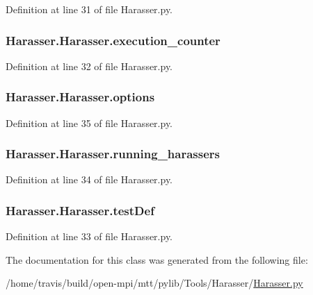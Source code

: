 Definition at line 31 of file Harasser.\-py.

\hypertarget{classHarasser_1_1Harasser_a96c7c91ef5d33784056c567ba49a2c8a}{
\subsubsection[{execution\-\_\-counter}]{\setlength{\rightskip}{0pt plus 5cm}Harasser.\-Harasser.\-execution\-\_\-counter}}\label{classHarasser_1_1Harasser_a96c7c91ef5d33784056c567ba49a2c8a}


Definition at line 32 of file Harasser.\-py.

\hypertarget{classHarasser_1_1Harasser_ab9ed73d71cdaae7d9b5cc81548823527}{
\subsubsection[{options}]{\setlength{\rightskip}{0pt plus 5cm}Harasser.\-Harasser.\-options}}\label{classHarasser_1_1Harasser_ab9ed73d71cdaae7d9b5cc81548823527}


Definition at line 35 of file Harasser.\-py.

\hypertarget{classHarasser_1_1Harasser_ad9d37d39c99222e899af613a573ecd15}{
\subsubsection[{running\-\_\-harassers}]{\setlength{\rightskip}{0pt plus 5cm}Harasser.\-Harasser.\-running\-\_\-harassers}}\label{classHarasser_1_1Harasser_ad9d37d39c99222e899af613a573ecd15}


Definition at line 34 of file Harasser.\-py.

\hypertarget{classHarasser_1_1Harasser_adddf34aabbc91934437e1a30134224c3}{
\subsubsection[{test\-Def}]{\setlength{\rightskip}{0pt plus 5cm}Harasser.\-Harasser.\-test\-Def}}\label{classHarasser_1_1Harasser_adddf34aabbc91934437e1a30134224c3}


Definition at line 33 of file Harasser.\-py.



The documentation for this class was generated from the following file\-:\begin{DoxyCompactItemize}
\item 
/home/travis/build/open-\/mpi/mtt/pylib/\-Tools/\-Harasser/\hyperlink{Harasser_8py}{Harasser.\-py}\end{DoxyCompactItemize}
